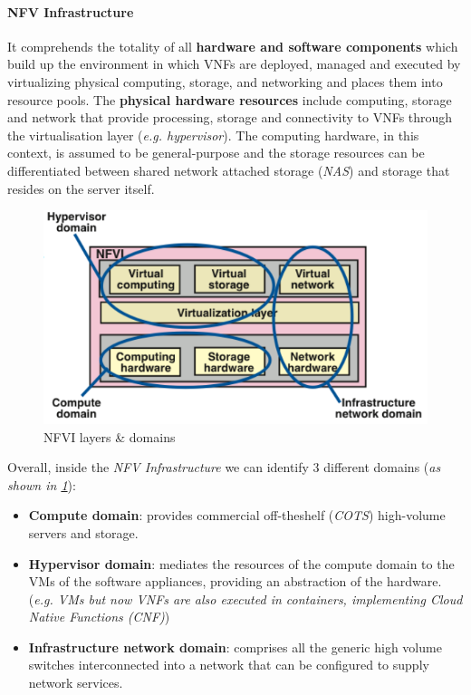 \documentclass[10pt,a4paper]{report}
\theoremstyle{definition}
\begin{document}
\paragraph{NFV Infrastructure}\label{sec:nfv-infrastructure}
It comprehends the totality of all \textbf{hardware and software components} which build up the environment in which VNFs are deployed, managed and executed by  virtualizing physical computing, storage, and networking and places them into resource pools.
The \textbf{physical hardware resources} include computing, storage and network that provide processing, storage and connectivity to VNFs through the virtualisation layer (\textit{e.g. hypervisor}). The computing hardware, in this context, is assumed to be general-purpose and the storage resources can be differentiated between shared network attached storage (\textit{NAS}) and storage that resides on the server itself.
\begin{figure}[h]
	\centering\includegraphics[scale=0.50]{images/Pasted image 20230409200655.png}
	\caption{NFVI layers \& domains}
\label{nfv-domains}
\end{figure}
Overall, inside the \textit{NFV Infrastructure} we can identify 3 different domains (\textit{as shown in \ref{nfv-domains}}):
\begin{itemize}
	\item 
	\textbf{Compute domain}: provides commercial off-theshelf (\textit{COTS}) high-volume servers and storage.
	\item 
	\textbf{Hypervisor domain}: mediates the resources of the compute domain to the VMs of the software appliances, providing an abstraction of the hardware. (\textit{e.g. VMs but now VNFs are also executed in containers, implementing Cloud Native Functions (CNF)})
	\item 
	\textbf{Infrastructure network domain}: comprises all the generic high volume switches interconnected into a network that can be configured to supply network services.
\end{itemize}
\end{document}
